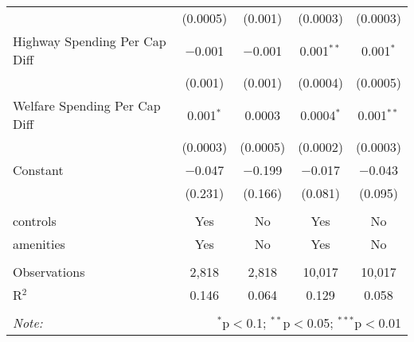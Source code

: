 \begin{table}[!htbp]
\begin{tabular}{@{\extracolsep{5pt}}lcccc}
  & (0.0005) & (0.001) & (0.0003) & (0.0003) \\ 
  Highway Spending Per Cap Diff & $-$0.001 & $-$0.001 & 0.001$^{**}$ & 0.001$^{*}$ \\ 
  & (0.001) & (0.001) & (0.0004) & (0.0005) \\ 
  Welfare Spending Per Cap Diff & 0.001$^{*}$ & 0.0003 & 0.0004$^{*}$ & 0.001$^{**}$ \\ 
  & (0.0003) & (0.0005) & (0.0002) & (0.0003) \\ 
  Constant & $-$0.047 & $-$0.199 & $-$0.017 & $-$0.043 \\ 
  & (0.231) & (0.166) & (0.081) & (0.095) \\ 
 \hline \\[-1.8ex] 
controls & Yes & No & Yes & No \\ 
amenities & Yes & No & Yes & No \\ 
\hline \\[-1.8ex] 
Observations & 2,818 & 2,818 & 10,017 & 10,017 \\ 
R$^{2}$ & 0.146 & 0.064 & 0.129 & 0.058 \\ 
\hline 
\hline \\[-1.8ex] 
\textit{Note:}  & \multicolumn{4}{r}{$^{*}$p$<$0.1; $^{**}$p$<$0.05; $^{***}$p$<$0.01} \\ 
\end{tabular} 
\end{table} 

